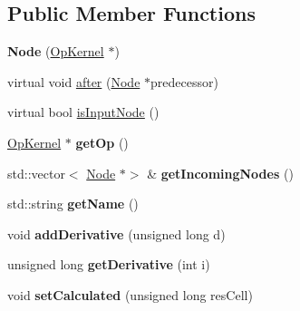 \subsection*{Public Member Functions}
\begin{DoxyCompactItemize}
\item 
\mbox{\label{classathena_1_1core_1_1_node_a7c8ca7c16db4d9d55b2ea3f4336e73ec}} 
{\bfseries Node} (\mbox{\hyperlink{classathena_1_1core_1_1_op_kernel}{Op\+Kernel}} $\ast$)
\item 
virtual void \mbox{\hyperlink{classathena_1_1core_1_1_node_aefef588463c8e215e998415a7cc6b320}{after}} (\mbox{\hyperlink{classathena_1_1core_1_1_node}{Node}} $\ast$predecessor)
\item 
virtual bool \mbox{\hyperlink{classathena_1_1core_1_1_node_a6ae012557fc6b29127366b1e92801d4a}{is\+Input\+Node}} ()
\item 
\mbox{\label{classathena_1_1core_1_1_node_a185a846d26ff9e8bbe21c03ce32aca47}} 
\mbox{\hyperlink{classathena_1_1core_1_1_op_kernel}{Op\+Kernel}} $\ast$ {\bfseries get\+Op} ()
\item 
\mbox{\label{classathena_1_1core_1_1_node_ae4e0e34ffc5d79c5a18d33847cc80331}} 
std\+::vector$<$ \mbox{\hyperlink{classathena_1_1core_1_1_node}{Node}} $\ast$$>$ \& {\bfseries get\+Incoming\+Nodes} ()
\item 
\mbox{\label{classathena_1_1core_1_1_node_a28043abbb7dc60c6a510839928fa2408}} 
std\+::string {\bfseries get\+Name} ()
\item 
\mbox{\label{classathena_1_1core_1_1_node_a290e21f4231f4193c2877b8b85c1864a}} 
void {\bfseries add\+Derivative} (unsigned long d)
\item 
\mbox{\label{classathena_1_1core_1_1_node_a5f737753ebd25e521c0ac8a995ca7625}} 
unsigned long {\bfseries get\+Derivative} (int i)
\item 
\mbox{\label{classathena_1_1core_1_1_node_af0d6ae48f88c47a04c592c71c4b119e7}} 
void {\bfseries set\+Calculated} (unsigned long res\+Cell)
\item 
$$
\end{DoxyCompactItemize}
